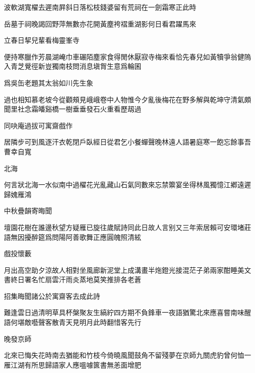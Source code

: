 \documentclass{zhvt-classic-Miya}
\begin{document}
波軟湖寬櫂去遲南屛斜日落松枝錢婆留有荒祠在一劍霜寒正此時

岳墓于祠晚謁回野萍無數亦花開黃塵袴褶重湖影何日看君躍馬來

\begin{fw}立春日挈兒輩看梅靈峯寺\end{fw}

便持寒臘作芳晨湖崦巾車碾陌塵家食得閒休厭寂寺梅來看恰先春兒如黃犢爭翁健隖入青芝覺徑新豈獨南枝問消息塡胷生意爲輪囷

\begin{fw}爲吳缶老題其太翁如川先生象\end{fw}

過也相知慕老坡今從顴頰見峨峨卷中人物惟今夕亂後梅花在野多解與乾坤守清氣頗聞里社念霜皤谿橋一樹垂垂發石火重看歷刼過

\begin{fw}同吷庵過拔可寓齋戲作\end{fw}

居隣步可到風逐汗衣乾閉戶臥經日從君乞小餐蟬聲晚林遠人語暑庭寒一飽忘餘事吾曹幸自寬

\begin{fw}北海\end{fw}

何言狀北海一水似南中過櫂花光亂藏山石氣同數來忘禁籞宴坐得林風獨憶江鄕遠遲歸媿雁鴻

\begin{fw}中秋疊韻寄晦聞\end{fw}

壇園花樹在誰邊秋望方疑雁已旋往歲賦詩同此日故人言别又三年索居賴可安環堵莊語無因擾醉筵爲問陽阿善歌舞正應圓魄照清絃

\begin{fw}戲投懷藪\end{fw}

月出高空助夕涼故人相對坐風廊新泥堂上成溝畫半炧鐙光接混茫子弟兩家酣睡美文書終日署名忙扇雲汗雨炎蒸地莫笑推排各老蒼

\begin{fw}招集晦聞諸公於寓齋客去成此詩\end{fw}

難逢雲日過清明草具杯槃聚友生縞紵四方期不負鋒車一夜語猶驚北來應喜嘗南味醒語何堪敵囈聲客散青天見明月此時翻惜客先行

\begin{fw}晚發京師\end{fw}

北來已悔失花時南去猶能和竹枝今倚曉風聞鼓角不留殘夢在京師九關虎豹曾何恤一雁江湖有所思歸語家人應嗢噱篋書無恙面增肥
\end{document}
